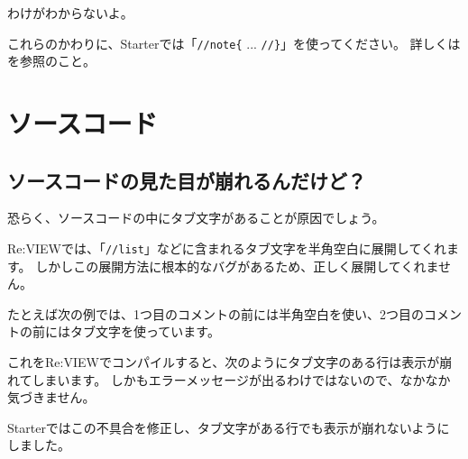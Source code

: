 \starterresult
\begin{reviewminicolumn}
\end{reviewminicolumn}
\endstarterresult

わけがわからないよ。

これらのかわりに、Starterでは「\texttt{//note\{} ... \texttt{//\}}」を使ってください。
詳しくはを参照のこと。

\section{ソースコード}
\label{sec:2-4}

\subsection{ソースコードの見た目が崩れるんだけど？}
\label{sec:2-4-1}

恐らく、ソースコードの中にタブ文字があることが原因でしょう。

Re:VIEWでは、「\texttt{//list}」などに含まれるタブ文字を半角空白に展開してくれます。
しかしこの展開方法に根本的なバグがあるため、正しく展開してくれません。

たとえば次の例では、1つ目のコメントの前には半角空白を使い、2つ目のコメントの前にはタブ文字を使っています。

\begin{starterprogram}\end{starterprogram}

これをRe:VIEWでコンパイルすると、次のようにタブ文字のある行は表示が崩れてしまいます。
しかもエラーメッセージが出るわけではないので、なかなか気づきません。

\noindent
{}

\starterresult
\begin{starterterminal}\end{starterterminal}
\endstarterresult

Starterではこの不具合を修正し、タブ文字がある行でも表示が崩れないようにしました。

